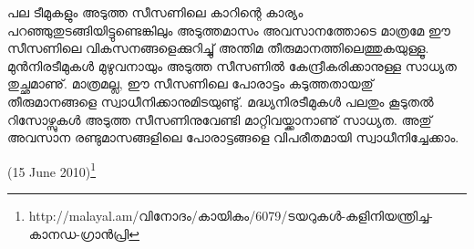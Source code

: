 പല ടീമുകളും അടുത്ത സീസണിലെ കാറിന്റെ കാര്യം പറഞ്ഞുതുടങ്ങിയിട്ടുണ്ടെങ്കിലും അടുത്തമാസം അവസാനത്തോടെ 
മാത്രമേ ഈ സീസണിലെ വികസനങ്ങളെക്കുറിച്ചു് അന്തിമ തീരുമാനത്തിലെത്തുകയുള്ളൂ. മുന്‍നിരടീമുകള്‍ മുഴുവനായും 
അടുത്ത സീസണില്‍ കേന്ദ്രീകരിക്കാനുള്ള സാധ്യത തുച്ഛമാണു്. മാത്രമല്ല, ഈ സീസണിലെ പോരാട്ടം കടുത്തതായതു് 
തീരുമാനങ്ങളെ സ്വാധീനിക്കാനുമിടയുണ്ടു്. മദ്ധ്യനിരടീമുകള്‍ പലതും കൂടുതല്‍ റിസോഴ്സുകള്‍ അടുത്ത സീസണിനുവേണ്ടി 
മാറ്റിവയ്ക്കാനാണു് സാധ്യത. അതു് അവസാന രണ്ടുമാസങ്ങളിലെ പോരാട്ടങ്ങളെ വിപരീതമായി സ്വാധീനിച്ചേക്കാം.

(15 June 2010)\footnote{http://malayal.am/വിനോദം/കായികം/6079/ടയറുകള്‍-കളിനിയന്ത്രിച്ച-കാനഡ-ഗ്രാന്‍പ്രി}

\newpage
